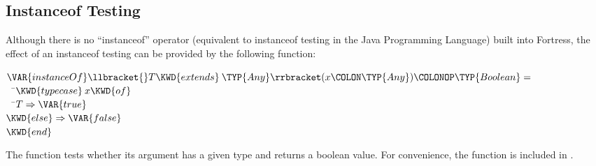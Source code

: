 %
%
%
%

\subsection{Instanceof Testing}

Although there is no ``instanceof'' operator (equivalent to instanceof
testing in the Java Programming Language) built into Fortress, the effect
of an instanceof testing can be provided by the following function:
\begin{Fortress}
\(\VAR{instanceOf}\llbracket{}T \KWD{extends}\mskip 4mu plus 4mu\TYP{Any}\rrbracket(x\COLON \TYP{Any})\COLONOP\TYP{Boolean} = \)\\
{\tt~~}\pushtabs\=\+\(  \KWD{typecase}\mskip 4mu plus 4mu{x} \KWD{of}\)\\
{\tt~~}\pushtabs\=\+\(    T \Rightarrow \VAR{true}\)\\
\(    \KWD{else} \Rightarrow \VAR{false}\)\-\\\poptabs
\(  \KWD{end}\)\-\\\poptabs
\end{Fortress}
The function tests whether its argument has a given type and returns a
boolean value.
For convenience, the function  is included in \library.
